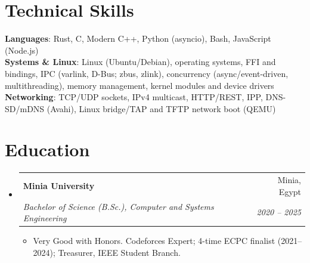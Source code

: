 \documentclass[letterpaper,11pt]{article}
\makeatletter
\newcommand{\resumeItem}[1]{
  \item\small{
    {#1 \vspace{-2pt}}
  }
}
\newcommand{\resumeSubheading}[4]{
  \vspace{-2pt}\item
    \begin{tabular*}{0.97\textwidth}[t]{l@{\extracolsep{\fill}}r}
      \textbf{#1} & #2 \\
      \textit{\small#3} & \textit{\small #4} \\
    \end{tabular*}\vspace{-7pt}
}
\newcommand{\resumeSubHeadingListStart}{\begin{itemize}[leftmargin=0.15in, label={}]}
\newcommand{\resumeSubHeadingListEnd}{\end{itemize}}
\newcommand{\resumeItemListStart}{\begin{itemize}}
\newcommand{\resumeItemListEnd}{\end{itemize}\vspace{-5pt}}
\makeatother
\begin{document}
%
\section{Technical Skills}
 \begin{itemize}[leftmargin=0.15in, label={}]
    \small{\item{
     \textbf{Languages}{: Rust, C, Modern C++, Python (asyncio), Bash, JavaScript (Node.js)} \\
     \textbf{Systems \& Linux}{: Linux (Ubuntu/Debian), operating systems, FFI and bindings, IPC (varlink, D-Bus; zbus, zlink), concurrency (async/event-driven, multithreading), memory management, kernel modules and device drivers} \\
     \textbf{Networking}{: TCP/UDP sockets, IPv4 multicast, HTTP/REST, IPP, DNS-SD/mDNS (Avahi), Linux bridge/TAP and TFTP network boot (QEMU)}
    }}
 \end{itemize}

\section{Education}
  \resumeSubHeadingListStart
    \resumeSubheading
      {Minia University}{Minia, Egypt}
      {Bachelor of Science (B.Sc.), Computer and Systems Engineering}{2020 -- 2025}
      \resumeItemListStart
        \resumeItem{Very Good with Honors. Codeforces Expert; 4-time ECPC finalist (2021--2024); Treasurer, IEEE Student Branch.}
      \resumeItemListEnd
  \resumeSubHeadingListEnd


\end{document}
